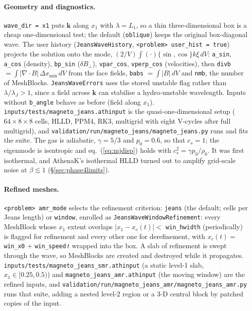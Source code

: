 \documentclass[11pt]{article}
\newcommand{\code}[1]{\texttt{#1}}
\newcommand{\file}[1]{\texttt{\small #1}}
\newcommand{\fn}[1]{\texttt{\small #1}}
\begin{document}
\paragraph{Geometry and diagnostics.} \code{wave\_dir = x1} puts $\mathbf k$ along $x_1$
with $\lambda = L_1$, so a thin three-dimensional box is a cheap one-dimensional test; the
default (\code{oblique}) keeps the original box-diagonal wave. The user history
(\fn{JeansWaveHistory}, \code{<problem> user\_hist = true}) projects the solution onto the
mode, $(2/V)\int(\cdot)\{\sin,\cos\}k\xi\,dV$: \code{a\_sin}, \code{a\_cos} (density),
\code{bp\_sin} ($\delta B_\perp$), \code{vpar\_cos}, \code{vperp\_cos} (velocities), then
\code{divb} $=\int|\nabla\!\cdot\!B|\,\Delta x_{\min}\,dV$ from the face fields,
\code{babs} $=\int|B|\,dV$ and \code{nmb}, the number of MeshBlocks.
\fn{JeansWaveErrors} uses the stored unstable flag rather than $\lambda/\lambda_J > 1$, since
a field across $\mathbf k$ can stabilise a hydro-unstable wavelength. Inputs without
\code{b\_angle} behave as before (field along $x_1$).
\file{inputs/tests/magneto\_jeans.athinput} is the quasi-one-dimensional setup
($64\times8\times8$ cells, HLLD, PPM4, RK3, multigrid with eight V-cycles after full
multigrid), and \file{validation/run/magneto\_jeans/magneto\_jeans.py} runs and fits the
suite. The gas is adiabatic, $\gamma = 5/3$ and $p_0 = 0.6$, so that $c_s = 1$; the
eigenmode is isentropic and eq.~(\ref{eq:mjdisp}) holds with $c_s^2 = \gamma p_0/\rho_0$.
It was first isothermal, and AthenaK's isothermal HLLD turned out to amplify grid-scale noise
at $\beta \lesssim 1$ (\S\ref{sec:phase4limits}).

\paragraph{Refined meshes.} \code{<problem> amr\_mode} selects the refinement criterion:
\code{jeans} (the default; cells per Jeans length) or \code{window}, enrolled as
\fn{JeansWaveWindowRefinement}: every MeshBlock whose $x_1$ extent overlaps
$|x_1 - x_c(t)| < $ \code{win\_hwidth} (periodically) is flagged for refinement and every
other one for derefinement, with $x_c(t) = $ \code{win\_x0} $+$ \code{win\_speed}$\,t$
wrapped into the box. A slab of refinement is swept through the wave, so MeshBlocks are
created and destroyed while it propagates. \file{inputs/tests/magneto\_jeans\_smr.athinput}
(a static level-1 slab, $x_1\in[0.25, 0.5)$) and \file{magneto\_jeans\_amr.athinput} (the
moving window) are the refined inputs, and
\file{validation/run/magneto\_jeans\_amr/magneto\_jeans\_amr.py} runs that suite, adding a
nested level-2 region or a 3-D central block by patched copies of the input.
\end{document}
